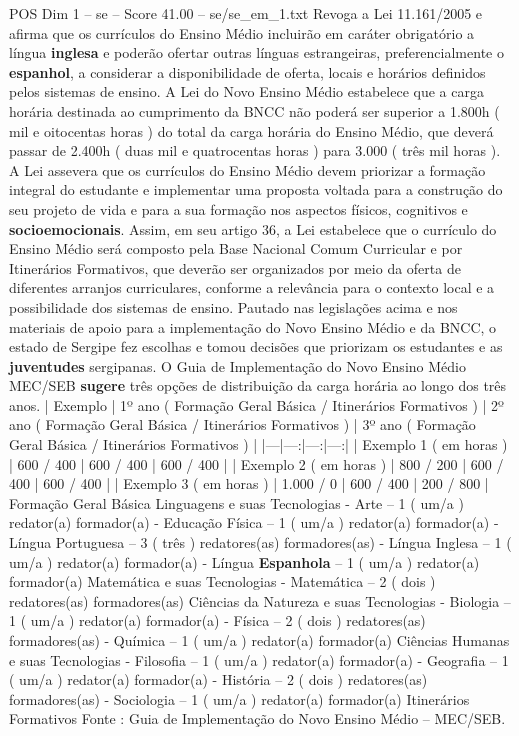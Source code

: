 \begin{textsample}{POS Dim 1 – se – Score 41.00 – se/se\_em\_1.txt}
Revoga a Lei 11.161/2005 e afirma que os currículos do Ensino Médio incluirão em caráter obrigatório a língua \textbf{inglesa} e poderão ofertar outras línguas estrangeiras, preferencialmente o \textbf{espanhol}, a considerar a disponibilidade de oferta, locais e horários definidos pelos sistemas de ensino.
A Lei do Novo Ensino Médio estabelece que a carga horária destinada ao cumprimento da BNCC não poderá ser superior a 1.800h ( mil e oitocentas horas ) do total da carga horária do Ensino Médio, que deverá passar de 2.400h ( duas mil e quatrocentas horas ) para 3.000 ( três mil horas ).
A Lei assevera que os currículos do Ensino Médio devem priorizar a formação integral do estudante e implementar uma proposta voltada para a construção do seu projeto de vida e para a sua formação nos aspectos físicos, cognitivos e \textbf{socioemocionais}.
Assim, em seu artigo 36, a Lei estabelece que o currículo do Ensino Médio será composto pela Base Nacional Comum Curricular e por Itinerários Formativos, que deverão ser organizados por meio da oferta de diferentes arranjos curriculares, conforme a relevância para o contexto local e a possibilidade dos sistemas de ensino.
Pautado nas legislações acima e nos materiais de apoio para a implementação do Novo Ensino Médio e da BNCC, o estado de Sergipe fez escolhas e tomou decisões que priorizam os estudantes e as \textbf{juventudes} sergipanas.
O Guia de Implementação do Novo Ensino Médio MEC/SEB \textbf{sugere} três opções de distribuição da carga horária ao longo dos três anos. | Exemplo | 1º ano ( Formação Geral Básica / Itinerários Formativos ) | 2º ano ( Formação Geral Básica / Itinerários Formativos ) | 3º ano ( Formação Geral Básica / Itinerários Formativos ) | |---|---:|---:|---:| | Exemplo 1 ( em horas ) | 600 / 400 | 600 / 400 | 600 / 400 | | Exemplo 2 ( em horas ) | 800 / 200 | 600 / 400 | 600 / 400 | | Exemplo 3 ( em horas ) | 1.000 / 0 | 600 / 400 | 200 / 800 | Formação Geral Básica Linguagens e suas Tecnologias - Arte – 1 ( um/a ) redator(a) formador(a) - Educação Física – 1 ( um/a ) redator(a) formador(a) - Língua Portuguesa – 3 ( três ) redatores(as) formadores(as) - Língua Inglesa – 1 ( um/a ) redator(a) formador(a) - Língua \textbf{Espanhola} – 1 ( um/a ) redator(a) formador(a) Matemática e suas Tecnologias - Matemática – 2 ( dois ) redatores(as) formadores(as) Ciências da Natureza e suas Tecnologias - Biologia – 1 ( um/a ) redator(a) formador(a) - Física – 2 ( dois ) redatores(as) formadores(as) - Química – 1 ( um/a ) redator(a) formador(a) Ciências Humanas e suas Tecnologias - Filosofia – 1 ( um/a ) redator(a) formador(a) - Geografia – 1 ( um/a ) redator(a) formador(a) - História – 2 ( dois ) redatores(as) formadores(as) - Sociologia – 1 ( um/a ) redator(a) formador(a) Itinerários Formativos Fonte : Guia de Implementação do Novo Ensino Médio – MEC/SEB.

\end{textsample}
